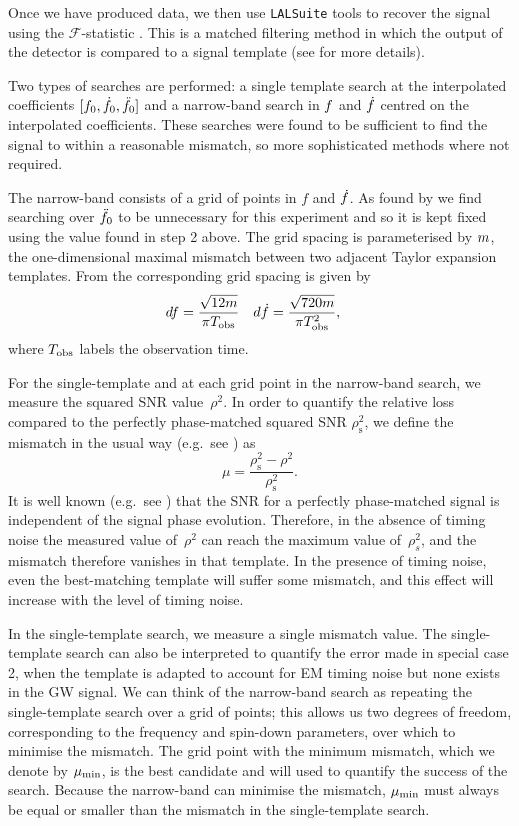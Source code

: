 \documentclass[../full_thesis/full_thesis.tex]{subfiles}
\begin{document}
Once we have produced data, we then use \verb+LALSuite+ tools to recover the
signal using the $\mathcal{F}$-statistic \citep{Jaranowski1998}. This is a
matched filtering method in which the output of the detector is compared to a
signal template (see \citet{Prix2009} for more details).

Two types of searches are performed: a single
template search at the interpolated coefficients $[f_{0}, \dot{f}_{0},
\ddot{f}_{0}]$ and a narrow-band search in $f$ and $\dot{f}$ centred on the
interpolated coefficients. These searches were found to be sufficient
to find the signal to within a reasonable mismatch, so more sophisticated
methods where not required.

The narrow-band consists of a grid of points in
$f$ and $\dot{f}$. As found by \citet{ligo2008} we find searching over
$\ddot{f}_{0}$ to be unnecessary for this experiment and so it is kept fixed using
the value found in step 2 above.
 The grid spacing is parameterised
by $m$, the one-dimensional maximal mismatch between two adjacent Taylor
expansion templates. From
\citet{ligo2013_EAH} the corresponding grid spacing is given by
\begin{align}
    df = \frac{\sqrt{12 m}}{\pi T_{\textrm{obs}}} &&&
    d\dot{f} = \frac{\sqrt{720 m}}{\pi T_{\textrm{obs}}^{2}},
\label{eqn: Grid spacing}
\end{align}
where $T_{\textrm{obs}}$ labels the observation time.

For the single-template and at each grid point in the narrow-band search, we
measure the squared SNR value~$\rho^{2}$.  In order to quantify the relative
loss compared to the perfectly phase-matched squared SNR
$\rho^{2}_{\mathrm{s}}$, we define the mismatch in the usual way (e.g.\ see
\citet{Prix2007}) as
\begin{equation}
    \mu = \frac{{\rho^{2}_{\mathrm{s}} -
                                  \rho^{2}}}{\rho^{2}_{\mathrm{s}}}.
\label{eqn:mismatch}
\end{equation}
It is well known (e.g.\ see \citet{Prix2009}) that the SNR for a
perfectly phase-matched signal is independent of the signal phase
evolution. Therefore, in the absence of timing
noise the measured value of~$\rho^{2}$ can reach the maximum value
of~$\rho^{2}_{s}$, and the mismatch therefore vanishes in that template.
In the presence of timing noise, even the best-matching template will
suffer some mismatch, and this effect will increase with the level of
timing noise.

In the single-template search, we measure a single mismatch value.  The
single-template search can also be interpreted to quantify the error made in
special case 2, when the template is adapted to account for EM timing noise but
none exists in the GW signal.  We can think of the narrow-band search as
repeating the single-template search over a grid of points; this allows us two
degrees of freedom, corresponding to the frequency and spin-down parameters,
over which to minimise the mismatch. The grid point with the minimum mismatch,
which we denote by $\mu_{\mathrm{min}}$, is the best candidate and will used to quantify
the success of the search.  Because the narrow-band can minimise the mismatch,
$\mu_{\mathrm{min}}$ must always be equal or smaller than the mismatch in the
single-template search.
\end{document}
